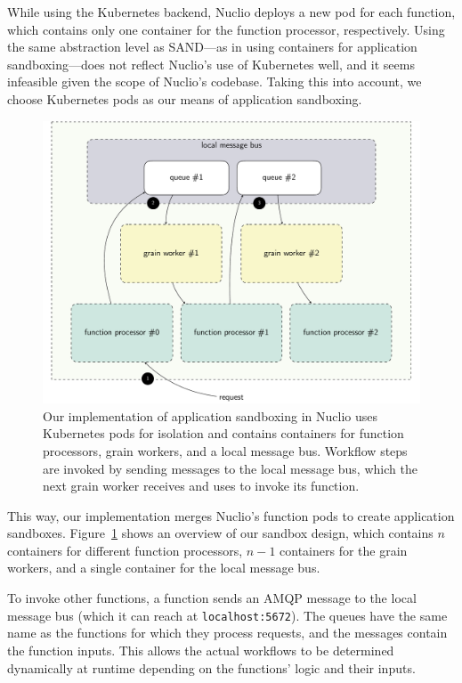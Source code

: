 While using the Kubernetes backend, Nuclio deploys a new pod for each function, which contains only one container for the function processor, respectively.
Using the same abstraction level as SAND—as in using containers for application sandboxing—does not reflect Nuclio's use of Kubernetes well, and it seems infeasible given the scope of Nuclio's codebase. 
Taking this into account, we choose Kubernetes pods as our means of application sandboxing.

\begin{figure}
    \centering
    \includegraphics[width=\linewidth]{figures/sandbox.pdf}
    \caption{
        Our implementation of application sandboxing in Nuclio uses Kubernetes pods for isolation and contains containers for function processors, grain workers, and a local message bus. 
        Workflow steps are invoked by sending messages to the local message bus, which the next grain worker receives and uses to invoke its function.
    }\label{fig:sandbox}
\end{figure}

This way, our implementation merges Nuclio's function pods to create application sandboxes. Figure~\ref{fig:sandbox} shows an overview of our sandbox design, which contains $n$ containers for different function processors, $n-1$ containers for the grain workers, and a single container for the local message bus.

To invoke other functions, a function sends an AMQP message to the local message bus (which it can reach at \texttt{localhost:5672}). 
The queues have the same name as the functions for which they process requests, and the messages contain the function inputs. 
This allows the actual workflows to be determined dynamically at runtime depending on the functions' logic and their inputs.

